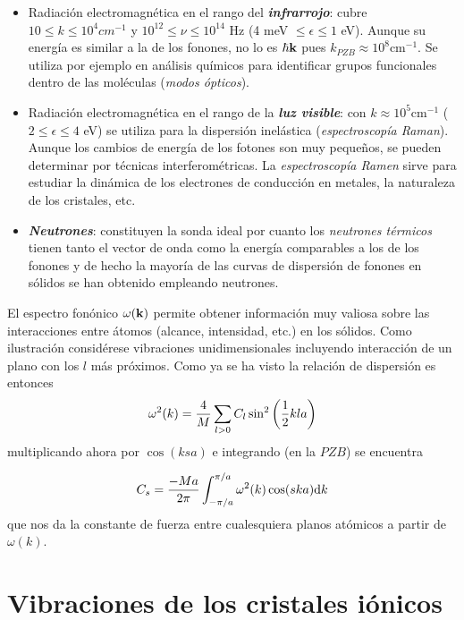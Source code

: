 \begin{itemize}
    \item Radiación electromagnética en el rango del \textbf{\textit{infrarrojo}}: cubre $10\le k \le 10^4 \unit{cm^{-1}}$ y $10^{12} \leq \nu \leq 10^{14}$ Hz (4 meV $\leq \epsilon \leq 1$ eV). Aunque su energía es similar a la de los fonones, no lo es $\hbar \mathbf{k}$ pues $k_{PZB} \approx 10^8  \unit{\cm^{-1}}$. Se utiliza por ejemplo en análisis químicos para identificar grupos funcionales dentro de las moléculas (\textit{modos ópticos}).
    \item Radiación electromagnética en el rango de la \textbf{\textit{luz visible}}: con $k\approx 10^5 \unit{\cm^{-1}}$ ($2\leq \epsilon \leq 4$ eV) se utiliza para la dispersión inelástica (\textit{espectroscopía Raman}). Aunque los cambios de energía de los fotones son muy pequeños, se pueden determinar por técnicas interferométricas. La \textit{espectroscopía Ramen} sirve para estudiar la dinámica de los electrones de conducción en metales, la naturaleza de los cristales, etc.
    \item \textbf{\textit{Neutrones}}: constituyen la sonda ideal por cuanto los \textit{neutrones térmicos} tienen tanto el vector de onda como la energía comparables a los de los fonones y de hecho la mayoría de las curvas de dispersión de fonones en sólidos se han obtenido empleando neutrones.
\end{itemize}


El espectro fonónico $\omega (\mathbf{k})$ permite obtener información muy valiosa sobre las interacciones entre átomos (alcance, intensidad, etc.) en los sólidos. Como ilustración considérese vibraciones unidimensionales incluyendo interacción de un plano con los $l$ más próximos. Como ya se ha visto la relación de dispersión es entonces
\begin{equation}
    \omega^2 (k) = \frac{4}{M} \sum_{l>0} C_l \sin^2 \left( \frac{1}{2} k la \right)
\end{equation}
multiplicando ahora por $\cos (ksa)$ e integrando (en la $PZB$) se encuentra

\begin{equation}
    C_s = \frac{-Ma}{2\pi} \int_{-\pi/a}^{\pi/a} \omega^2 (k) \cos (ska) \mathrm{d} k
\end{equation}
que nos da la constante de fuerza entre cualesquiera planos atómicos a partir de $\omega (k)$.

\section{Vibraciones de los cristales iónicos} \label{Sec:04-04}

